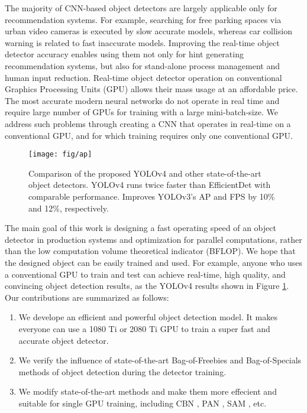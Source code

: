 \documentclass[10pt,twocolumn,letterpaper]{article}
\begin{document}
The majority of CNN-based object detectors are largely applicable only for recommendation systems. For example, searching for free parking spaces via urban video cameras is executed by slow accurate models, whereas car collision warning is related to fast inaccurate models. Improving the real-time object detector accuracy enables using them not only for hint generating recommendation systems, but also for stand-alone process management and human input reduction. Real-time object detector operation on conventional Graphics Processing Units (GPU) allows their mass usage at an affordable price. The most accurate modern neural networks do not operate in real time and require large number of GPUs for training with a large mini-batch-size. We address such problems through creating a CNN that operates in real-time on a conventional GPU, and for which training requires only one conventional GPU.

\begin{figure}[t]
	\begin{center}
		\texttt{[image: fig/ap]}
	\end{center}
    \vspace{-4mm}
	\caption{Comparison of the proposed YOLOv4 and other state-of-the-art object detectors. YOLOv4 runs twice faster than EfficientDet with comparable performance. Improves YOLOv3's AP and FPS by 10\% and 12\%, respectively.}
	\label{fig:ap}
\end{figure}

The main goal of this work is designing a fast operating speed of an object detector in production systems and optimization for parallel computations, rather than the low computation volume theoretical indicator (BFLOP). We hope that the designed object can be easily trained and used. For example, anyone who uses a conventional GPU to train and test can achieve real-time, high quality, and convincing object detection results, as the YOLOv4 results shown in  Figure \ref{fig:ap}. Our contributions are summarized as follows:

\begin{enumerate}
	\item We develope an efficient and powerful object detection model. It makes everyone can use a 1080 Ti or 2080 Ti GPU to train a super fast and accurate object detector.
	\item We verify the influence of state-of-the-art Bag-of-Freebies and Bag-of-Specials methods of object detection during the detector training.
	\item We modify state-of-the-art methods and make them more effecient and suitable for single GPU training, including CBN \cite{yao2020cross}, PAN \cite{liu2018path}, SAM \cite{woo2018cbam}, etc.
\end{enumerate}
\end{document}
